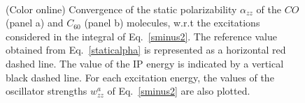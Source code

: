 \documentclass[reprint,aps,prb]{revtex4-1}
\begin{document}
\begin{figure}
\centering
{} \\
\centering
{}
\caption{\label{co_AlphaExc}(Color online) Convergence of the static polarizability $\alpha_{zz}$ of the $CO$ (panel a) and $C_{60}$ (panel b) molecules,
w.r.t the excitations considered in the integral of Eq.~\eqref{sminus2}. The reference value obtained from Eq.~\eqref{staticalpha} is represented as a
horizontal red dashed line. The value of the IP energy is indicated by a vertical black dashed line. For each excitation energy, the values of the
oscillator strengths $w^a_{zz}$ of Eq.~\eqref{sminus2} are also plotted. }
\end{figure}
\end{document}
